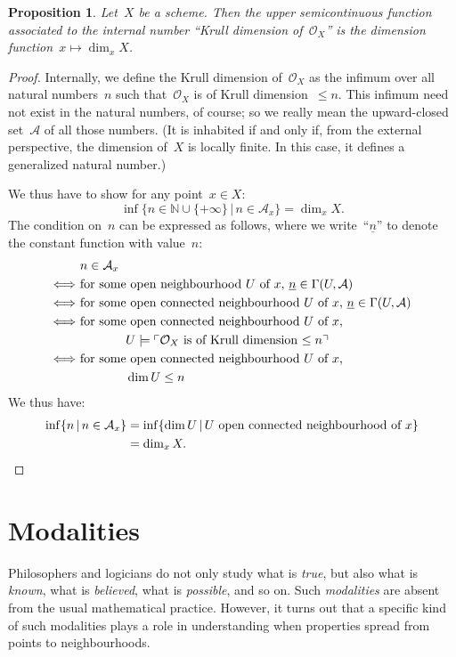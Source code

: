 \documentclass[10pt]{amsart}
\theoremstyle{definition}
\theoremstyle{plain}
\newtheorem{prop}[defn]{Proposition}
\theoremstyle{remark}
\newcommand{\A}{\mathcal{A}}
\renewcommand{\O}{\mathcal{O}}
\newcommand{\NN}{\mathbb{N}}
\newcommand{\ul}[1]{\underline{#1}}
\newcommand{\?}{\,{:}\,}
\renewcommand{\_}{\mathpunct{.}\,}
\newcommand{\speak}[1]{\ulcorner\text{\textnormal{#1}}\urcorner}
\begin{document}
\begin{prop}Let~$X$ be a scheme. Then the upper semicontinuous function
associated to the internal number ``Krull dimension of~$\O_X$'' is the
dimension function~$x \mapsto \dim_x X$.\end{prop}
\begin{proof}Internally, we define the Krull dimension of~$\O_X$ as the infimum
over all natural numbers~$n$ such that~$\O_X$ is of Krull
dimension~$\leq n$. This infimum need not exist in the natural numbers, of
course; so we really mean the upward-closed set~$\A$ of all those numbers. (It
is inhabited if and only if, from the external perspective, the dimension
of~$X$ is locally finite. In this case, it defines a generalized natural number.)

We thus have to show for any point~$x \in X$:
\[ \inf\{ n \in \NN \cup \{+\infty\} \,|\, n \in \A_x \} =
  \dim_x X. \]
The condition on~$n$ can be expressed as follows, where we write~``$\ul{n}$''
to denote the constant function with value~$n$:
\begin{align*}
  &\ n \in \A_x \\
  \Longleftrightarrow &\
  \text{for some open neighbourhood~$U$ of~$x$, $\ul{n} \in \Gamma(U,\A)$} \\
  \Longleftrightarrow &\
  \text{for some open connected neighbourhood~$U$ of~$x$, $\ul{n} \in \Gamma(U,\A)$} \\
  \Longleftrightarrow &\
  \text{for some open connected neighbourhood~$U$ of~$x$,} \\
  & \qquad\qquad U \models \speak{$\O_X$ is of Krull dimension~$\leq n$} \\
  \Longleftrightarrow &\
  \text{for some open connected neighbourhood~$U$ of~$x$,} \\
  & \qquad\qquad \dim U \leq n
\end{align*}
We thus have:
\begin{align*}
  \inf\{ n \,|\, n \in \A_x \} &=
    \inf\{ \dim U \,|\, \text{$U$ open connected neighbourhood of~$x$} \} \\
  &= \dim_x X. \qedhere
\end{align*}
\end{proof}


\section{Modalities}
\label{sect:modalities}

Philosophers and logicians do not only study what is \emph{true}, but also what
is \emph{known}, what is \emph{believed}, what is \emph{possible}, and so on.
Such \emph{modalities} are absent from the usual mathematical practice.
However, it turns out that a specific kind of such modalities plays a role in
understanding when properties spread from points to neighbourhoods.
\end{document}
